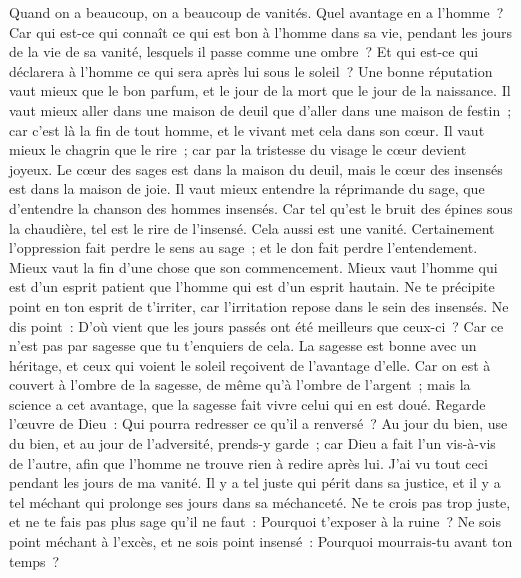 \begin{multicols}{2}
Quand on a beaucoup, on a beaucoup de vanités. Quel avantage en a l'homme~? 
Car qui est-ce qui connaît ce qui est bon à l'homme dans sa vie, pendant les jours de la vie de sa vanité, lesquels il passe comme une ombre~? Et qui est-ce qui déclarera à l'homme ce qui sera après lui sous le soleil~?
\VerseOne{}Une bonne réputation vaut mieux que le bon parfum, et le jour de la mort que le jour de la naissance.
Il vaut mieux aller dans une maison de deuil que d'aller dans une maison de festin~; car c'est là la fin de tout homme, et le vivant met cela dans son cœur.
Il vaut mieux le chagrin que le rire~; car par la tristesse du visage le cœur devient joyeux.
Le cœur des sages est dans la maison du deuil, mais le cœur des insensés est dans la maison de joie.
Il vaut mieux entendre la réprimande du sage, que d'entendre la chanson des hommes insensés.
Car tel qu'est le bruit des épines sous la chaudière, tel est le rire de l'insensé. Cela aussi est une vanité. 
Certainement l'oppression fait perdre le sens au sage~; et le don fait perdre l'entendement. 
Mieux vaut la fin d'une chose que son commencement. Mieux vaut l'homme qui est d'un esprit patient que l'homme qui est d'un esprit hautain. 
Ne te précipite point en ton esprit de t'irriter, car l'irritation repose dans le sein des insensés.
Ne dis point~: D'où vient que les jours passés ont été meilleurs que ceux-ci~? Car ce n'est pas par sagesse que tu t'enquiers de cela. 
La sagesse est bonne avec un héritage, et ceux qui voient le soleil reçoivent de l'avantage d'elle.
Car on est à couvert à l'ombre de la sagesse, de même qu'à l'ombre de l'argent~; mais la science a cet avantage, que la sagesse fait vivre celui qui en est doué. 
Regarde l'œuvre de Dieu~: Qui pourra redresser ce qu'il a renversé~?
Au jour du bien, use du bien, et au jour de l'adversité, prends-y garde~; car Dieu a fait l'un vis-à-vis de l'autre, afin que l'homme ne trouve rien à redire après lui. 
J'ai vu tout ceci pendant les jours de ma vanité. Il y a tel juste qui périt dans sa justice, et il y a tel méchant qui prolonge ses jours dans sa méchanceté.
Ne te crois pas trop juste, et ne te fais pas plus sage qu'il ne faut~: Pourquoi t'exposer à la ruine~?
Ne sois point méchant à l'excès, et ne sois point insensé~: Pourquoi mourrais-tu avant ton temps~?

\end{multicols}
